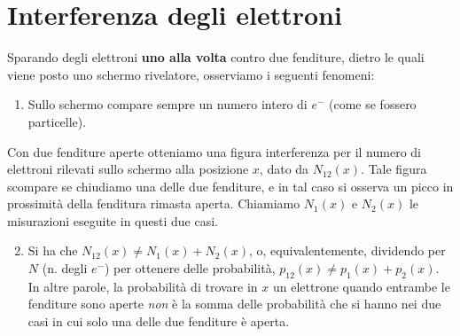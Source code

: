 \documentclass[FisicaTeorica.tex]{subfiles}
\begin{document}
\section{Interferenza degli elettroni}
Sparando degli elettroni \textbf{uno alla volta} contro due fenditure, dietro le quali viene posto uno schermo rivelatore, osserviamo i seguenti fenomeni:
\begin{enumerate}[label=\Roman*.]
    \item Sullo schermo  compare sempre un numero intero di $e^-$ (come se fossero particelle).
\end{enumerate}
Con due fenditure aperte otteniamo una figura interferenza per il numero di elettroni rilevati sullo schermo alla posizione $x$, dato da $N_{12}(x)$. Tale figura scompare se chiudiamo una delle due fenditure, e in tal caso si osserva un picco in prossimità della fenditura rimasta aperta. Chiamiamo $N_1(x)$ e $N_2(x)$ le misurazioni eseguite in questi due casi.\\
\begin{enumerate}[label=\Roman*.]
\setcounter{enumi}{1}
    \item Si ha che  $N_{12}(x) \neq N_1(x) + N_2(x)$, o, equivalentemente, dividendo per $N$ (n. degli $e^-$) per ottenere delle probabilità, $p_{12}(x) \neq p_1(x) + p_2(x)$. In altre parole, la probabilità di trovare in $x$ un elettrone quando entrambe le fenditure sono aperte \emph{non} è la somma delle probabilità che si hanno nei due casi in cui solo una delle due fenditure è aperta.
\end{enumerate}
\end{document}
